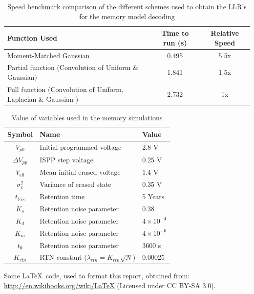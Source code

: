 \documentclass[11pt]{article}
\numberwithin{equation}{subsection}
\begin{document}
\begin{table}[ht]
\caption{Speed benchmark comparison of the different schemes used to obtain the LLR's for the memory model decoding}
\centering
\begin{tabular}{| l | c | c |}
\hline
Function Used & Time to run (s) & Relative Speed \\
\hline
Moment-Matched Gaussian & 0.495 & 5.5x \\
Partial function (Convolution of Uniform \& Gaussian) & 1.841 & 1.5x \\
Full function (Convolution of Uniform, Laplacian \& Gaussian \cite{hachem}) & 2.732 & 1x \\
\hline
\end{tabular}
\end{table}

\begin{table}[ht]
\caption{Value of variables used in the memory simulations}
\centering
\begin{tabular}{| c | l | l |}
\hline
Symbol & Name & Value \\
\hline
$V_{p0}$ & Initial programmed voltage & 2.8 V  \\
$\Delta V_{pp}$ & ISPP step voltage & 0.25 V  \\
$V_{e0}$ & Mean initial erased voltage & 1.4 V \\
$\sigma^2_e$ & Variance of erased state & 0.35 V \\
$t_{Yrs}$ & Retention time & 5 Years \\
$K_s$ & Retention noise parameter & 0.38 \\
$K_d$ & Retention noise parameter & $4\times 10^{-4}$ \\
$K_m$ & Retention noise parameter & $4\times 10^{-6}$ \\
$t_0$ & Retention noise parameter & 3600 s\\
$K_{rtn}$ & RTN constant ($\lambda_{rtn} = K_{rtn} \sqrt{N}$) & 0.00025 \\
\hline
\end{tabular}
\end{table}

\doublespacing
\printbibliography
\medskip
\noindent Some \LaTeX\ code, used to format this report, obtained from: \url{http://en.wikibooks.org/wiki/LaTeX} (Licensed under CC BY-SA 3.0).


\end{document}
